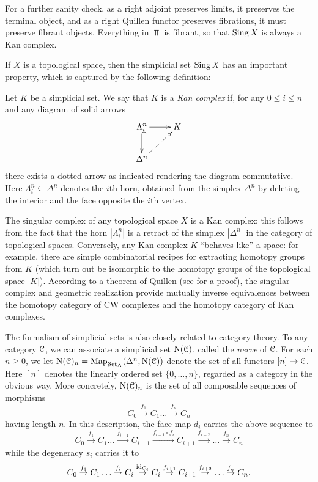 \begin{1.1.2 inf-Categories}
\begin{shaded}
For a further sanity check, as a right adjoint preserves limits, it preserves the terminal object, and as a right Quillen functor preserves fibrations, it must preserve fibrant objects. Everything in $\Top$ is fibrant, so that $\operatorname{Sing} X$ is always a Kan complex.
\end{shaded}

If $X$ is a topological space, then the simplicial set $\operatorname{Sing} X$ has an important property, which is captured by the following definition:

\begin{definition}\label{strongkan}
Let $K$ be a simplicial set. We say that $K$ is a {\it Kan complex} if, for any $0 \leq i \leq n$ and any diagram of solid arrows
$$ \xymatrix{ \Lambda^n_i \ar[r] \ar@{^{(}->}[d] & K \\
\Delta^n \ar@{-->}[ur],& }$$
there exists a dotted arrow as indicated rendering the diagram commutative. Here $\Lambda^n_i \subseteq \Delta^n$ denotes the $i$th horn, obtained from the simplex $\Delta^n$ by deleting the interior and the face opposite the $i$th vertex.
\end{definition}

The singular complex of any topological space $X$ is a Kan complex: this follows from the fact that the horn $| \Lambda^n_i |$ is a retract of the simplex $| \Delta^n |$ in the category of topological spaces. Conversely, any Kan complex $K$ ``behaves like'' a space: for example, there are simple combinatorial recipes for extracting homotopy groups from $K$ (which turn out be isomorphic to the homotopy groups of the topological space $|K|$). According to a theorem of Quillen (see \cite{goerssjardine} for a proof), the singular complex and geometric realization provide mutually inverse equivalences between the homotopy category of CW complexes and the homotopy category of Kan complexes.

The formalism of simplicial sets is also closely related to category theory. To any category $\operatorname{\mathcal{C}}$, we can associate a simplicial set $\operatorname{N}(\operatorname{\mathcal{C}})$, called the {\it nerve} of $\operatorname{\mathcal{C}}$. For each $n \geq 0$, we 
let $\operatorname{N}(\operatorname{\mathcal{C}})_{n} = \operatorname{{Map}}_{\operatorname{\mathcal{S}et_{\Delta}}}(\Delta^n, \operatorname{N}(\operatorname{\mathcal{C}}))$ denote the set of all functors $[n]
\rightarrow \operatorname{\mathcal{C}}$. Here $[n]$ denotes the linearly ordered set $\{ 0, \ldots, n \}$, regarded as a category in the obvious way. More
concretely, $\operatorname{N}(\operatorname{\mathcal{C}})_n$ is the set of all composable
sequences of morphisms
$$ C_0 \stackrel{f_1}{\rightarrow} C_1 \ldots \stackrel{f_n}{\rightarrow} C_n$$ having length $n$.
In this description, the face map $d_i$ carries the above sequence
to
$$C_0 \stackrel{f_1}{\rightarrow} C_1 \ldots \stackrel{f_{i-1}}{\rightarrow}
C_{i-1} \stackrel{ f_{i+1} \circ f_i }{\rightarrow} C_{i+1}
\stackrel{f_{i+2}}{\rightarrow} \ldots
\stackrel{f_{n}}{\rightarrow} C_n$$ while the degeneracy $s_i$
carries it to $$C_0 \stackrel{f_1}{\rightarrow} C_1 \ldots
\stackrel{f_i}{\rightarrow} C_i \stackrel{\operatorname{id}_{C_i}}{\rightarrow}
C_i \stackrel{f_{i+1}}{\rightarrow} C_{i+1}
\stackrel{f_{i+2}}{\rightarrow} \ldots \stackrel{f_n}{\rightarrow}
C_n.$$


\end{1.1.2 inf-Categories}
